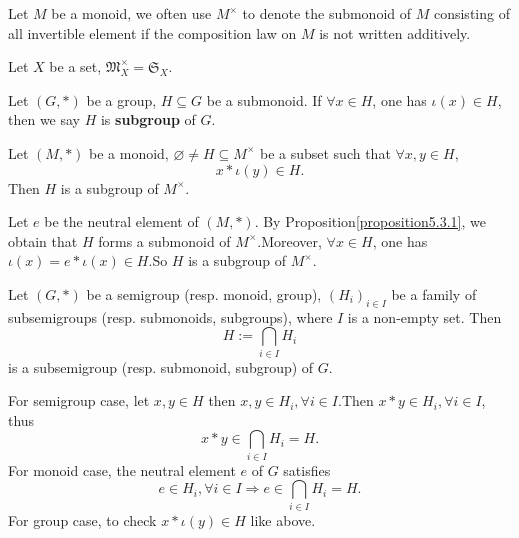 \begin{notationenv}
    Let $M$ be a monoid,  we often use $M^\times$ to denote the submonoid of $M$ consisting of all invertible element if the composition law on $M$ is not written additively.
\end{notationenv}
\begin{exampleenv}
    Let $X$ be a set,  $\mathfrak{M} _X^\times=\mathfrak{S} _X$.
\end{exampleenv}
\begin{definitionenv}
    Let $(G, *)$ be a group,  $H\subseteq G$ be a submonoid. If $\forall x\in H$,  one has $\iota(x)\in H$,  then we say $H$ is \textbf{subgroup} of $G$.
\end{definitionenv}
\begin{propositionenv}
    Let $(M, *)$ be a monoid,  $\varnothing \not=H\subseteq M^\times$ be a subset such that $\forall x, y \in H$, 
    $$x*\iota(y)\in H.$$
    Then $H$ is a subgroup of $M^\times$.
\end{propositionenv}
\begin{proofenv}
    Let $e$ be the neutral element of $(M, *)$. By Proposition\ref{proposition5.3.1},  we obtain that $H$ forms a submonoid of $M^\times$.Moreover,  $\forall x \in H$,  one has $\iota(x)=e*\iota(x)\in H$.So $H$ is a subgroup of $M^\times$.
\end{proofenv}
\begin{propositionenv}
    Let $(G, *)$ be a semigroup (resp. monoid, group),  $(H_i)_{i\in I}$ be a family of subsemigroups (resp. submonoids, subgroups), where $I$ is a non-empty set. Then 
    $$H:=\bigcap_{i\in I}H_i$$
    is a subsemigroup (resp. submonoid, subgroup) of $G$.
\end{propositionenv}
\begin{proofenv}
    \quad\newline
    For semigroup case, let $x, y\in H$ then $x, y\in H_i, \forall i \in I$.Then $x*y\in H_i, \forall i \in I $,  thus 
    $$x*y\in \bigcap_{i\in I}H_i=H.$$
    For monoid case, the neutral element $e$ of $G$ satisfies
    $$e \in H_i, \forall i \in I\Rightarrow e\in \bigcap_{i\in I}H_i=H.$$
    For group case, to check $x*\iota(y)\in H$ like above.
\end{proofenv}
